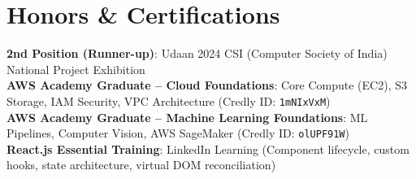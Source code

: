 \documentclass[letterpaper,11pt]{article}
\begin{document}
\section{Honors \& Certifications}
 \begin{itemize}[leftmargin=0.15in, label={}]
    \small{\item{
     \textbf{2nd Position (Runner-up)}{: Udaan 2024 CSI (Computer Society of India) National Project Exhibition} \\
     \textbf{AWS Academy Graduate -- Cloud Foundations}{: Core Compute (EC2), S3 Storage, IAM Security, VPC Architecture (Credly ID: \texttt{1mNIxVxM})} \\
     \textbf{AWS Academy Graduate -- Machine Learning Foundations}{: ML Pipelines, Computer Vision, AWS SageMaker (Credly ID: \texttt{olUPF91W})} \\
     \textbf{React.js Essential Training}{: LinkedIn Learning (Component lifecycle, custom hooks, state architecture, virtual DOM reconciliation)}
    }}
 \end{itemize}
\end{document}
